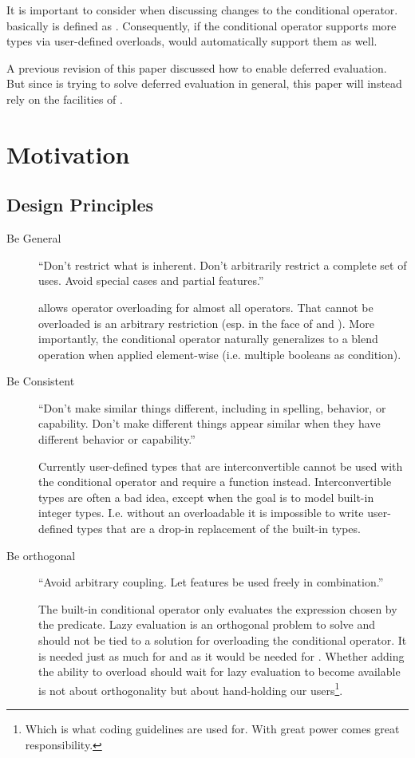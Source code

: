 It is important to consider  when discussing changes to the conditional operator.
 basically is defined as .
Consequently, if the conditional operator supports more types via user-defined overloads,  would automatically support them as well.

A previous revision of this paper discussed how to enable deferred evaluation.
But since \textcite{P0927R2} is trying to solve deferred evaluation in general, this paper will instead rely on the facilities of \cite{P0927R2}.

\section{Motivation}
\subsection{Design Principles}
\begin{description}
  \item[Be General] “Don’t restrict what is inherent.
    Don’t arbitrarily restrict a complete set of uses.
    Avoid special cases and partial features.” \cite{P0745R0}

    \CC{} allows operator overloading for almost all operators.
    That  cannot be overloaded is an arbitrary restriction (esp. in the face of  and ).
    More importantly, the conditional operator naturally generalizes to a blend operation when applied element-wise (i.e. multiple booleans as condition).

  \item[Be Consistent] “Don’t make similar things different, including in spelling, behavior, or capability.
    Don’t make different things appear similar when they have different behavior or capability.”

    Currently user-defined types that are interconvertible cannot be used with the conditional operator and require a function instead.
    Interconvertible types are often a bad idea, except when the goal is to model built-in integer types.
    I.e. without an overloadable  it is impossible to write user-defined types that are a drop-in replacement of the built-in types.

  \item[Be orthogonal] “Avoid arbitrary coupling.
    Let features be used freely in combination.”

    The built-in conditional operator only evaluates the expression chosen by the predicate.
    Lazy evaluation is an orthogonal problem to solve and should not be tied to a solution for overloading the conditional operator.
    It is needed just as much for  and  as it would be needed for .
    Whether adding the ability to overload  should wait for lazy evaluation to become available is not about orthogonality but about hand-holding our users\footnote{Which is what coding guidelines are used for. With great power comes great responsibility.}.
\end{description}

